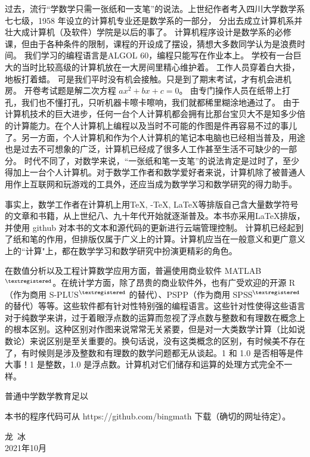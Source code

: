 \documentclass[main.tex]{subfiles}
\begin{document}
过去，流行“学数学只需一张纸和一支笔”的说法。上世纪作者考入四川大学数学系七七级，1958 年设立的计算机专业还是数学系的一部分，
分出去成立计算机系并壮大成计算机（及软件）学院是以后的事了。
计算机程序设计是数学系的必修课，但由于各种条件的限制，课程的开设成了摆设，猜想大多数同学认为是浪费时间。
我们学习的编程语言是ALGOL 60，编程只能写在作业本上。
学校有一台巨大的当时比较高级的计算机放在一大房间里精心维护着。
工作人员穿着白大掛，地板打着蜡。
可是我们平时没有机会接触。只是到了期末考试，才有机会进机房。
开卷考试题是解二次方程 $ax^2+bx+c = 0$。
由专门操作人员在纸带上打孔，我们也不懂打孔，只听机器卡嚓卡嚓响，我们就都稀里糊涂地通过了。
由于计算机技术的巨大进步，任何一台个人计算机都会拥有比那台宝贝大不是知多少倍的计算能力。在个人计算机上编程以及当时不可能的作图是件再容易不过的事儿了。另一方面，个人计算机和作为个人计算机的笔记本电脑也已经相当普及，用途也是过去不可想象的广泛，计算机已经成了很多人工作甚至生活不可缺少的一部分。
时代不同了，对数学来说，“一张纸和笔一支笔”的说法肯定是过时了，至少得加上一台个人计算机。对于数学工作者和数学爱好者来说，计算机除了被普通人用作上互联网和玩游戏的工具外，还应当成为数学学习和数学研究的得力助手。

事实上，数学工作者在计算机上用\TeX, \AmS-\TeX, \LaTeX 等排版自己含大量数学符号的文章和书籍，从上世纪八、九十年代开始就逐渐普及。本书亦采用\LaTeX 排版， 并使用 github 对本书的文本和源代码的更新进行云端管理控制。
计算机已经起到了纸和笔的作用，但排版仅属于广义上的计算。计算机应当在一般意义和更广意义上的“计算"上，都在数学学习和数学研究中扮演更精彩的角色。

在数值分析以及工程计算数学应用方面，普遍使用商业软件 MATLAB${}^{\textregistered}$。在统计学方面，除了昂贵的商业软件外，也有广受欢迎的开源 R（作为商用 S-PLUS${}^{\textregistered}$ 的替代）、PSPP（作为商用 SPSS${}^{\textregistered}$ 的替代）等等。这些软件都有针对性特别强的编程语言。这些针对性使得这些语言对于纯数学来讲，过于着眼浮点数的运算而忽视了浮点数与整数和有理数在概念上的根本区别。这种区别对作图来说常常无关紧要，但是对一大类数学计算（比如说数论）来说区别是至关重要的。换句话说，没有这类概念的区别，有时候美不存在了，有时候则是涉及整数和有理数的数学问题都无从谈起。1 和 1.0 是否相等是件大事！1 是整数，1.0 是浮点数。计算机对它们储存和运算的处理方式完全不一样。

普通中学数学教育足以


本书的程序代码可从 https://github.com/bingmath 下载（确切的网址待定）。


\begin{flushright}
	\centering
{\kaishu 龙\,  冰}\\
2021年10月
\end{flushright}
\end{document}
